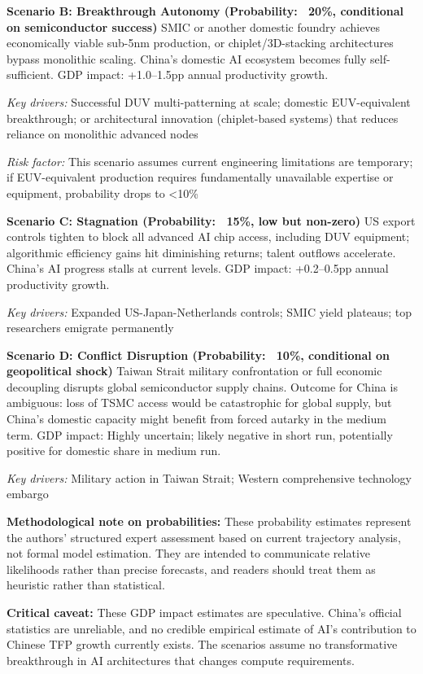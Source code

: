 \documentclass[11pt,a4paper]{article}
\begin{document}
\textbf{Scenario B: Breakthrough Autonomy (Probability: ~20\%, conditional on semiconductor success)}
SMIC or another domestic foundry achieves economically viable sub-5nm production, or chiplet/3D-stacking architectures bypass monolithic scaling. China's domestic AI ecosystem becomes fully self-sufficient. GDP impact: +1.0--1.5pp annual productivity growth.
\item \textit{Key drivers:} Successful DUV multi-patterning at scale; domestic EUV-equivalent breakthrough; or architectural innovation (chiplet-based systems) that reduces reliance on monolithic advanced nodes
\item \textit{Risk factor:} This scenario assumes current engineering limitations are temporary; if EUV-equivalent production requires fundamentally unavailable expertise or equipment, probability drops to <10\%

\textbf{Scenario C: Stagnation (Probability: ~15\%, low but non-zero)}
US export controls tighten to block all advanced AI chip access, including DUV equipment; algorithmic efficiency gains hit diminishing returns; talent outflows accelerate. China's AI progress stalls at current levels. GDP impact: +0.2--0.5pp annual productivity growth.
\item \textit{Key drivers:} Expanded US-Japan-Netherlands controls; SMIC yield plateaus; top researchers emigrate permanently

\textbf{Scenario D: Conflict Disruption (Probability: ~10\%, conditional on geopolitical shock)}
Taiwan Strait military confrontation or full economic decoupling disrupts global semiconductor supply chains. Outcome for China is ambiguous: loss of TSMC access would be catastrophic for global supply, but China's domestic capacity might benefit from forced autarky in the medium term. GDP impact: Highly uncertain; likely negative in short run, potentially positive for domestic share in medium run.
\item \textit{Key drivers:} Military action in Taiwan Strait; Western comprehensive technology embargo

\textbf{Methodological note on probabilities:} These probability estimates represent the authors' structured expert assessment based on current trajectory analysis, not formal model estimation. They are intended to communicate relative likelihoods rather than precise forecasts, and readers should treat them as heuristic rather than statistical.

\textbf{Critical caveat:} These GDP impact estimates are speculative. China's official statistics are unreliable, and no credible empirical estimate of AI's contribution to Chinese TFP growth currently exists. The scenarios assume no transformative breakthrough in AI architectures that changes compute requirements.
\end{document}
